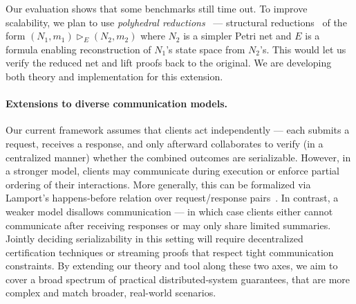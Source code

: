 Our evaluation shows that some benchmarks still time out.
To improve scalability, we plan to use \textit{polyhedral reductions}~\cite{AmBeDa21} --- structural reductions~\cite{Be87,BeLeDa20} of the form $(N_1, m_1) \vartriangleright_E (N_2, m_2)$ where $N_2$ is a simpler Petri net and $E$ is a formula enabling reconstruction of $N_1$'s state space from $N_2$'s. This would let us verify the reduced net and lift proofs back to the original.
%
%
%
We are developing both theory and implementation for this extension.



\paragraph{Extensions to diverse communication models.}

Our current framework assumes that clients act independently --- each submits a request, receives a response, and only afterward collaborates to verify (in a centralized manner) whether the combined outcomes are serializable. However, in a stronger model, clients may communicate during execution or enforce partial ordering of their interactions. More generally, this can be formalized via Lamport’s happens‐before relation over request/response pairs~\cite{La78}. 
%
In contrast, a weaker model disallows communication --- in which case clients either cannot communicate after receiving responses or may only share limited summaries. Jointly deciding serializability in this setting will require decentralized certification techniques or streaming proofs that respect tight communication constraints. 
%
By extending our theory and tool along these two axes, we aim to cover a broad spectrum of practical distributed‐system guarantees, that are more complex and match broader, real-world scenarios.

%
%
%

